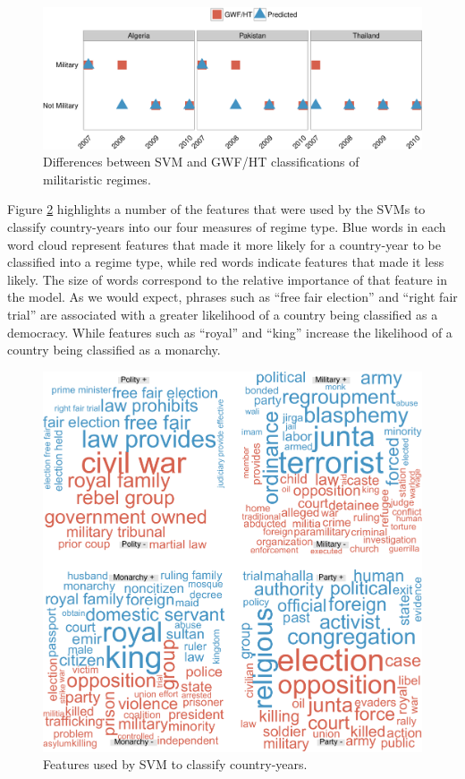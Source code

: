 \documentclass[pdftex,12pt,fullpage,oneside]{amsart}
\begin{document}
\begin{figure}[ht]
	\centering
	\includegraphics[width=.9\textwidth]{military_perfChange}
	\caption{Differences between SVM and GWF/HT classifications of militaristic regimes.}
	\label{fig:milChng}
\end{figure}
\FloatBarrier

Figure \ref{fig:wrdCloud} highlights a number of the features that were used by the SVMs to classify country-years into our four measures of regime type. Blue words in each word cloud represent features that made it more likely for a country-year to be classified into a regime type, while red words indicate features that made it less likely. The size of words correspond to the relative importance of that feature in the model. As we would expect, phrases such as ``free fair election'' and ``right fair trial'' are associated with a greater likelihood of a country being classified as a democracy. While features such as ``royal'' and ``king'' increase the likelihood of a country being classified as a monarchy. 

\begin{figure}[ht]
	\centering
	\includegraphics[width=.7\textwidth]{pol_bin_wrdCloud}
	\caption{Features used by SVM to classify country-years.}
	\label{fig:wrdCloud}
\end{figure}
\FloatBarrier
\end{document}
